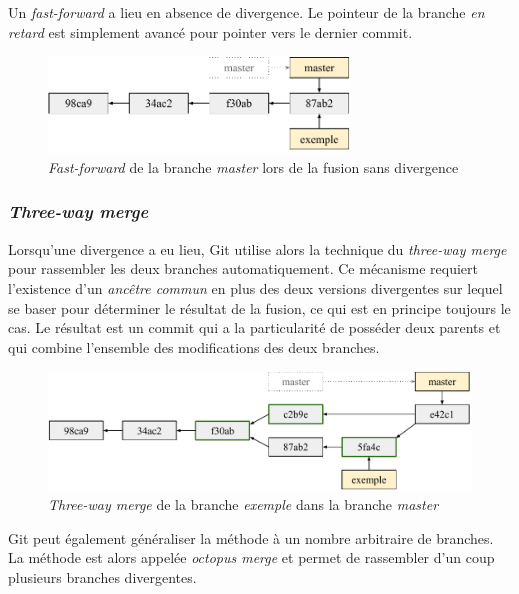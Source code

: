\documentclass[11pt,a4paper]{article}
\begin{document}
Un \textit{fast-forward} a lieu en absence de divergence. Le pointeur de la branche \textit{en retard} est simplement avancé pour pointer vers le dernier commit.

\begin{figure}[h]
\begin{center}
\includegraphics[width=8cm]{img_fastf}
\caption{\textit{Fast-forward} de la branche \textit{master} lors de la fusion sans divergence}
\end{center}
\end{figure}

\subsubsection{\textit{Three-way merge}}

Lorsqu'une divergence a eu lieu, Git utilise alors la technique du \textit{three-way merge} pour rassembler les deux branches automatiquement. 
Ce mécanisme requiert l'existence d'un \textit{ancêtre commun} en plus des deux versions divergentes sur lequel se baser pour déterminer le résultat de la fusion, ce qui est en principe toujours le cas. 
Le résultat est un commit qui a la particularité de posséder deux parents et qui combine l'ensemble des modifications des deux branches.

\begin{figure}[ht]
\begin{center}
\includegraphics[width=13cm]{img_twmerge}
\caption{\textit{Three-way merge} de la branche \textit{exemple} dans la branche \textit{master}}
\end{center}
\end{figure}

Git peut également généraliser la méthode à un nombre arbitraire de branches. La méthode est alors appelée \textit{octopus merge} et permet de rassembler d'un coup plusieurs branches divergentes.
\end{document}
